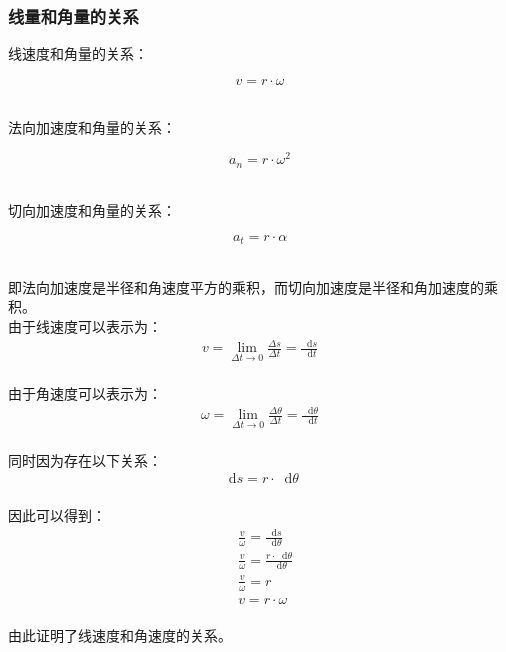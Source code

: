 \documentclass[UTF8]{ctexart}
\newcommand*{\dif}{\mathop{}\!\mathrm{d}}
\begin{document}
\subsubsection{线量和角量的关系}
    \setcounter{equation}{0}
    线速度和角量的关系：
    \begin{large}
        \begin{equation*}
            v=r\cdot\omega
        \end{equation*}
    \end{large}\\
    法向加速度和角量的关系：
    \begin{large}
        \begin{equation*}
            a_n=r\cdot\omega^2
        \end{equation*}
    \end{large}\\
    切向加速度和角量的关系：
    \begin{large}
        \begin{equation*}
            a_t=r\cdot\alpha
        \end{equation*}
    \end{large}\\
    即法向加速度是半径和角速度平方的乘积，而切向加速度是半径和角加速度的乘积。\\[12mm]
    由于线速度可以表示为：
    \begin{align}
        v=\lim_{\Delta t\rightarrow 0}\frac{\Delta s}{\Delta t}=\frac{\dif s}{\dif t}
    \end{align}\\
    由于角速度可以表示为：
    \begin{align}
        \omega=\lim_{\Delta t\rightarrow 0}\frac{\Delta\theta}{\Delta t}=\frac{\dif \theta}{\dif t}
    \end{align}\\
    同时因为存在以下关系：
    \begin{align}
        \dif s=r\cdot\dif \theta
    \end{align}\\
    因此可以得到：
    \begin{align}
        &\frac{v}{\omega}=\frac{\dif s}{\dif \theta}\\[5mm]
        &\frac{v}{\omega}=\frac{r\cdot \dif \theta}{\dif \theta}\\[5mm]
        &\frac{v}{\omega}=r\\[5mm]
        &v=r\cdot\omega
    \end{align}\\
    由此证明了线速度和角速度的关系。
\end{document}
